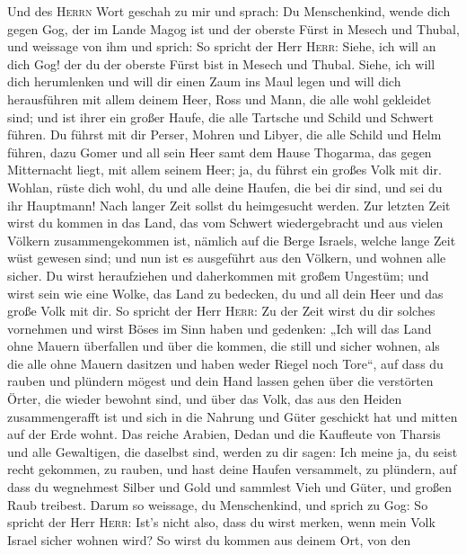  Und des \textsc{Herrn} Wort geschah zu mir und sprach:
 Du Menschenkind, wende dich gegen Gog, der im Lande Magog
ist und der oberste Fürst in Mesech und Thubal, und weissage von ihm
 und sprich: So spricht der Herr \textsc{Herr}: Siehe, ich
will an dich Gog! der du der oberste Fürst bist in Mesech und Thubal.
 Siehe, ich will dich herumlenken und will dir einen Zaum
ins Maul legen und will dich herausführen mit allem deinem Heer, Ross
und Mann, die alle wohl gekleidet sind; und ist ihrer ein großer Haufe,
die alle Tartsche und Schild und Schwert führen.  Du
führst mit dir Perser, Mohren und Libyer, die alle Schild und Helm
führen,  dazu Gomer und all sein Heer samt dem Hause
Thogarma, das gegen Mitternacht liegt, mit allem seinem Heer; ja, du
führst ein großes Volk mit dir.  Wohlan, rüste dich wohl,
du und alle deine Haufen, die bei dir sind, und sei du ihr Hauptmann!
 Nach langer Zeit sollst du heimgesucht werden. Zur
letzten Zeit wirst du kommen in das Land, das vom Schwert wiedergebracht
und aus vielen Völkern zusammengekommen ist, nämlich auf die Berge
Israels, welche lange Zeit wüst gewesen sind; und nun ist es ausgeführt
aus den Völkern, und wohnen alle sicher.  Du wirst
heraufziehen und daherkommen mit großem Ungestüm; und wirst sein wie
eine Wolke, das Land zu bedecken, du und all dein Heer und das große
Volk mit dir.  So spricht der Herr \textsc{Herr}: Zu der
Zeit wirst du dir solches vornehmen und wirst Böses im Sinn haben
 und gedenken: „Ich will das Land ohne Mauern überfallen
und über die kommen, die still und sicher wohnen, als die alle ohne
Mauern dasitzen und haben weder Riegel noch Tore``,  auf
dass du rauben und plündern mögest und dein Hand lassen gehen über die
verstörten Örter, die wieder bewohnt sind, und über das Volk, das aus
den Heiden zusammengerafft ist und sich in die Nahrung und Güter
geschickt hat und mitten auf der Erde wohnt.  Das reiche
Arabien, Dedan und die Kaufleute von Tharsis und alle Gewaltigen, die
daselbst sind, werden zu dir sagen: Ich meine ja, du seist recht
gekommen, zu rauben, und hast deine Haufen versammelt, zu plündern, auf
dass du wegnehmest Silber und Gold und sammlest Vieh und Güter, und
großen Raub treibest.  Darum so weissage, du
Menschenkind, und sprich zu Gog: So spricht der Herr \textsc{Herr}:
Ist's nicht also, dass du wirst merken, wenn mein Volk Israel sicher
wohnen wird?  So wirst du kommen aus deinem Ort, von den
